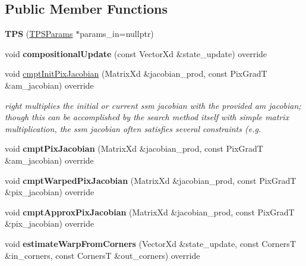 \subsection*{Public Member Functions}
\begin{DoxyCompactItemize}
\item 
\hypertarget{classTPS_a7e711155afcf26699da1948653572ccd}{{\bfseries T\-P\-S} (\hyperlink{structTPSParams}{T\-P\-S\-Params} $\ast$params\-\_\-in=nullptr)}\label{classTPS_a7e711155afcf26699da1948653572ccd}

\item 
\hypertarget{classTPS_a017dff6726378045225febb366a687db}{void {\bfseries compositional\-Update} (const Vector\-Xd \&state\-\_\-update) override}\label{classTPS_a017dff6726378045225febb366a687db}

\item 
void \hyperlink{classTPS_ac3ae041e2b26fdcb1df4f98b27f12152}{cmpt\-Init\-Pix\-Jacobian} (Matrix\-Xd \&jacobian\-\_\-prod, const Pix\-Grad\-T \&am\-\_\-jacobian) override
\begin{DoxyCompactList}\small\item\em right multiplies the initial or current ssm jacobian with the provided am jacobian; though this can be accomplished by the search method itself with simple matrix multiplication, the ssm jacobian often satisfies several constraints (e.\-g. \end{DoxyCompactList}\item 
\hypertarget{classTPS_a3c7d8ebbbe724d0078acf49ac30c80f9}{void {\bfseries cmpt\-Pix\-Jacobian} (Matrix\-Xd \&jacobian\-\_\-prod, const Pix\-Grad\-T \&am\-\_\-jacobian) override}\label{classTPS_a3c7d8ebbbe724d0078acf49ac30c80f9}

\item 
\hypertarget{classTPS_ad568fcb1c9e1143f16aa0db522427e5a}{void {\bfseries cmpt\-Warped\-Pix\-Jacobian} (Matrix\-Xd \&jacobian\-\_\-prod, const Pix\-Grad\-T \&pix\-\_\-jacobian) override}\label{classTPS_ad568fcb1c9e1143f16aa0db522427e5a}

\item 
\hypertarget{classTPS_a2fa392a87d762daa7133f0d2dd362154}{void {\bfseries cmpt\-Approx\-Pix\-Jacobian} (Matrix\-Xd \&jacobian\-\_\-prod, const Pix\-Grad\-T \&pix\-\_\-jacobian) override}\label{classTPS_a2fa392a87d762daa7133f0d2dd362154}

\item 
\hypertarget{classTPS_a3ab31713c723c99e8c93cbbade526dcc}{void {\bfseries estimate\-Warp\-From\-Corners} (Vector\-Xd \&state\-\_\-update, const Corners\-T \&in\-\_\-corners, const Corners\-T \&out\-\_\-corners) override}\label{classTPS_a3ab31713c723c99e8c93cbbade526dcc}


\end{DoxyCompactItemize}
